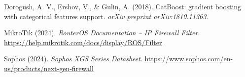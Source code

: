 \documentclass[12pt, letterpaper, oneside]{report}
\begin{document}
\begin{enumerate}[leftmargin=*, label={[\arabic*]}]
  \item Dorogush, A. V., Ershov, V., \& Gulin, A. (2018). CatBoost: gradient boosting with categorical features support. \textit{arXiv preprint arXiv:1810.11363}.

  \item MikroTik (2024). \textit{RouterOS Documentation -- IP Firewall Filter}. \url{https://help.mikrotik.com/docs/display/ROS/Filter}

  \item Sophos (2024). \textit{Sophos XGS Series Datasheet}. \url{https://www.sophos.com/en-us/products/next-gen-firewall}

\end{enumerate}
\end{document}
